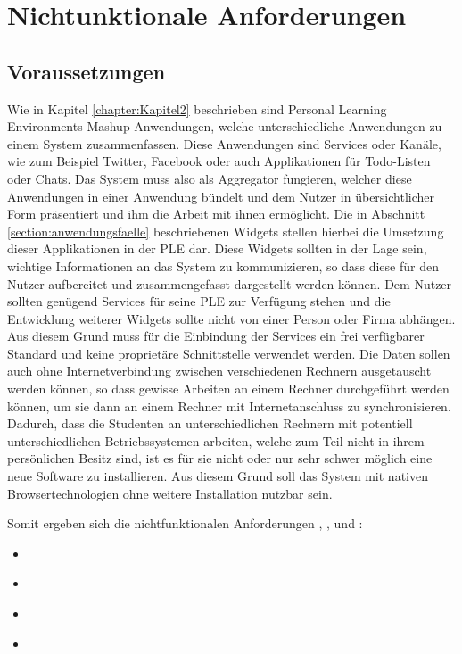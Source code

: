 \section{Nichtunktionale Anforderungen}\label{section:nichtfunktionale_anforderunge}

\subsection{Voraussetzungen}
Wie in Kapitel \ref{chapter:Kapitel2} beschrieben sind Personal Learning Environments Mashup-Anwendungen, welche unterschiedliche Anwendungen zu einem System zusammenfassen. Diese Anwendungen sind Services oder Kanäle, wie zum Beispiel Twitter, Facebook oder auch Applikationen für Todo-Listen oder Chats. Das System muss also als Aggregator fungieren, welcher diese Anwendungen in einer Anwendung bündelt und dem Nutzer in übersichtlicher Form präsentiert und ihm die Arbeit mit ihnen ermöglicht. Die in Abschnitt \ref{section:anwendungsfaelle} beschriebenen Widgets stellen hierbei die Umsetzung dieser Applikationen in der PLE dar. Diese Widgets sollten in der Lage sein, wichtige Informationen an das System zu kommunizieren, so dass diese für den Nutzer aufbereitet und zusammengefasst dargestellt werden können. Dem Nutzer sollten genügend Services für seine PLE zur Verfügung stehen und die Entwicklung weiterer Widgets sollte nicht von einer Person oder Firma abhängen. Aus diesem Grund muss für die Einbindung der Services ein frei verfügbarer Standard und keine proprietäre Schnittstelle verwendet werden. Die Daten sollen auch ohne Internetverbindung zwischen verschiedenen Rechnern ausgetauscht werden können, so dass gewisse Arbeiten an einem Rechner durchgeführt werden können, um sie dann an einem Rechner mit Internetanschluss zu synchronisieren. Dadurch, dass die Studenten an unterschiedlichen Rechnern mit potentiell unterschiedlichen Betriebssystemen arbeiten, welche zum Teil nicht in ihrem persönlichen Besitz sind, ist es für sie nicht oder nur sehr schwer möglich eine neue Software zu installieren. Aus diesem Grund soll das System mit nativen Browsertechnologien ohne weitere Installation nutzbar sein.

Somit ergeben sich die nichtfunktionalen Anforderungen , ,  und : 
\begin{itemize}
 \item \requirement{\requirementAggregator}\label{requirementAggregator}
 \item \requirement{\requirementWidgetStandard}\label{requirementWidgetStandard}
 \item \requirement{\requirementUsbStick}\label{requirementUsbStick}
 \item \requirement{\requirementUsageInBrowser}\label{requirementUsageInBrowser}
\end{itemize}

